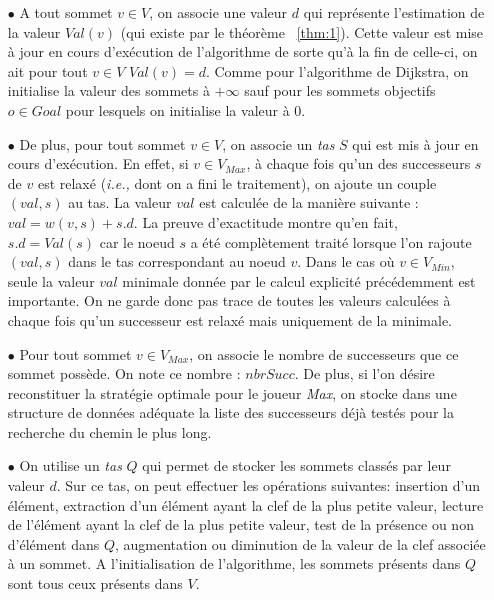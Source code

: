 \begin{enumerate}
	
	\item[$\bullet$] A tout sommet $v \in V$, on associe une valeur $d$ qui représente l'estimation de la valeur $Val(v)$ (qui existe par le théorème ~\ref{thm:1}). Cette valeur est mise à jour en cours d'exécution de l'algorithme de sorte qu'à la fin de celle-ci, on ait pour tout $v \in V$ $Val(v) = d$. Comme pour l'algorithme de Dijkstra, on initialise la valeur des sommets à $+\infty$ sauf pour les sommets objectifs $o \in Goal$ pour lesquels on initialise la valeur à 0.
	
	\item[$\bullet$] De plus, pour tout sommet $v \in V$, on associe un \textit{tas} $S$  qui est mis à jour en cours d'exécution. En effet, si $v \in V_{Max}$, à chaque fois qu'un des successeurs $s$ de $v$ est relaxé (\emph{i.e.,} dont on a fini le traitement), on ajoute un couple $(val,s)$ au tas. La valeur $val$ est calculée de la manière suivante : $val = w(v,s) + s.d$. La preuve d'exactitude montre qu'en fait, $s.d = Val(s)$ car le noeud $s$ a été complètement traité lorsque l'on rajoute $(val,s)$ dans le tas correspondant au noeud $v$. Dans le cas où $v \in V_{Min}$, seule la valeur $val$ minimale donnée par le calcul explicité précédemment est importante. On ne garde donc pas trace de toutes les valeurs calculées à chaque fois qu'un successeur est relaxé mais uniquement de la minimale.
	
	\item[$\bullet$] Pour tout sommet $v \in V_{Max}$, on associe le nombre de successeurs que ce sommet possède. On note ce nombre : $nbrSucc$. De plus, si l'on désire reconstituer la stratégie optimale pour le joueur \textit{Max}, on stocke dans une structure de données adéquate la liste des successeurs déjà testés pour la recherche du chemin le plus long.
	
		\item[$\bullet$] On utilise un \textit{tas} $Q$ qui permet de stocker les sommets classés par leur valeur $d$. Sur ce tas, on peut effectuer les opérations suivantes: insertion d'un élément, extraction d'un élément ayant la clef de la plus petite valeur, lecture de l'élément ayant la clef de la plus petite valeur, test de la présence ou non d'élément dans $Q$, augmentation ou diminution de la valeur de la clef associée à un sommet. A l'initialisation de l'algorithme, les sommets présents dans $Q$ sont tous ceux présents dans $V$.
	

\end{enumerate}
